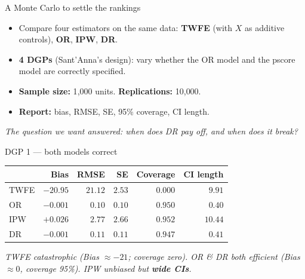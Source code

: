\documentclass[aspectratio=169,11pt]{beamer}
\begin{document}
\begin{frame}{A Monte Carlo to settle the rankings}
\vspace{0.6em}
\begin{itemize}
  \item Compare four estimators on the same data: \textbf{TWFE} (with $X$ as additive controls), \textbf{OR}, \textbf{IPW}, \textbf{DR}.
  \item \textbf{4 DGPs} (Sant'Anna's design): vary whether the OR model and the pscore model are correctly specified.
  \item \textbf{Sample size:} 1{,}000 units. \;\textbf{Replications:} 10{,}000.
  \item \textbf{Report:} bias, RMSE, SE, 95\% coverage, CI length.
\end{itemize}
\vspace{0.5em}
\begin{center}
\small\color{warmgray}\itshape
The question we want answered: \;when does DR pay off, and when does it break?
\end{center}
\end{frame}

\begin{frame}{DGP 1 --- both models correct}
\vspace{0.4em}
\begin{center}
\small
\renewcommand{\arraystretch}{1.3}
\begin{tabular}{@{}lrrrrr@{}}
\toprule
            & \textbf{Bias} & \textbf{RMSE} & \textbf{SE} & \textbf{Coverage} & \textbf{CI length} \\
\midrule
TWFE        & $-20.95$ & $21.12$ & $2.53$ & $0.000$ & $9.91$ \\
OR          & $-0.001$ & $0.10$  & $0.10$ & $0.950$ & $0.40$ \\
IPW         & $+0.026$ & $2.77$  & $2.66$ & $0.952$ & $10.44$ \\
\rowcolor{remixgreenlight}
DR          & $-0.001$ & $0.11$  & $0.11$ & $0.947$ & $0.41$ \\
\bottomrule
\end{tabular}
\end{center}
\vspace{0.3em}
\begin{center}
\small\color{warmgray}\itshape
TWFE catastrophic (Bias $\approx -21$; coverage zero). \;OR \& DR both efficient (Bias $\approx 0$, coverage 95\%). \;IPW unbiased but \textbf{wide CIs}.
\end{center}
\end{frame}
\end{document}

